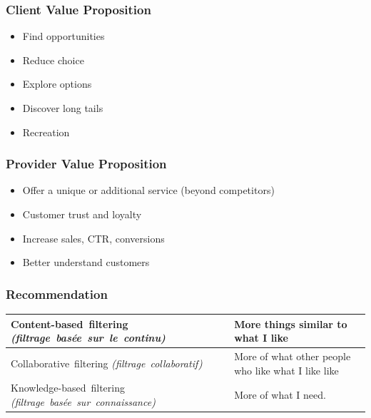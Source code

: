 \begin{frame}
  \frametitle{Client Value Proposition}
  \begin{itemize}
  \item Find opportunities
  \item Reduce choice
  \item Explore options
  \item Discover long tails
  \item Recreation
  \end{itemize}
\end{frame}

\begin{frame}
  \frametitle{Provider Value Proposition}

  \begin{itemize}
  \item Offer a unique or additional service (beyond competitors)
  \item Customer trust and loyalty
  \item Increase sales, CTR, conversions
  \item Better understand customers
  \end{itemize}
\end{frame}


\begin{frame}
  \frametitle{Recommendation}

  \begin{tabular}{|p{5.7cm}|p{4cm}|}
    \hline
    \topstrut\hbox{Content-based filtering}
    \hbox{\it (filtrage basée sur le continu)}
    &
    More things similar to what I like\bottomstrut
    \\
    \hline
    \topstrut\hbox{Collaborative filtering}
    \hbox{\it (filtrage collaboratif)}
    &
    More of what other people who like what I like like
    \bottomstrut
    \\
    \hline
    \topstrut\hbox{Knowledge-based filtering}
    \hbox{\it (filtrage basée sur connaissance)}\bottomstrut
    &
    More of what I need.\bottomstrut
    \\
    \hline
  \end{tabular}
\end{frame}

